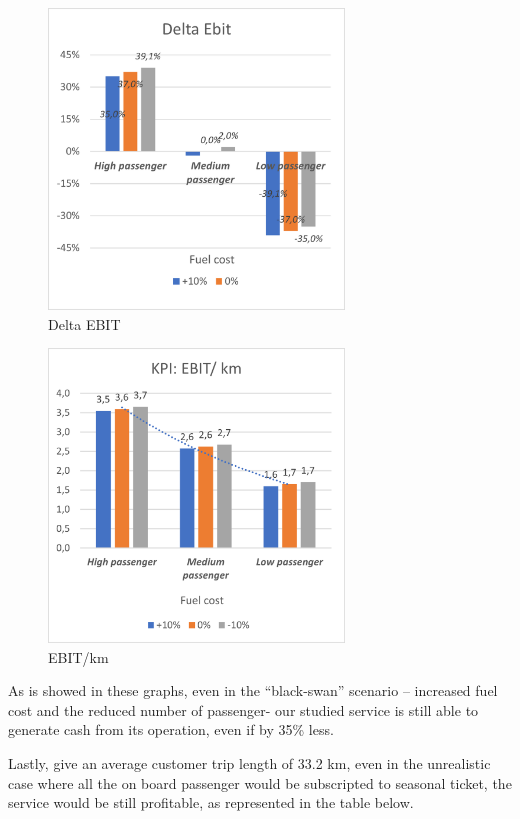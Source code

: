 \begin{figure}[h]
    \centering
    \includegraphics[width=0.7\textwidth]{Images/financial/ebitt.png}
    \caption{Delta EBIT}
    \label{fig:ebit}
\end{figure}

\begin{figure}[h]
    \centering
    \includegraphics[width=0.7\textwidth]{Images/financial/ebitkm.png}
    \caption{EBIT/km}
    \label{fig:ebitkm}
\end{figure}

As is showed in these graphs, even in the “black-swan” scenario – increased fuel cost and the reduced number of passenger- our studied service is still able to generate cash from its operation, even if by 35\% less.

Lastly, give an average customer trip length of 33.2 km, even in the unrealistic case where all the on board passenger would be subscripted to seasonal ticket, the service would be still profitable, as represented in the table below.

